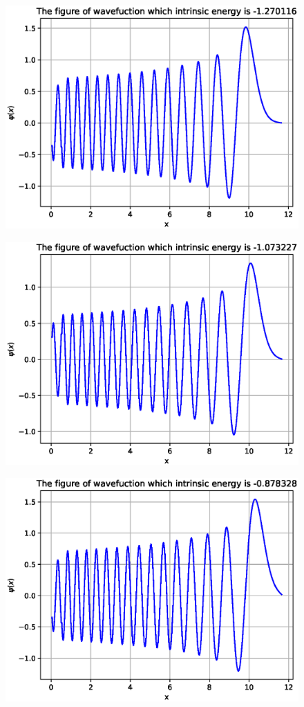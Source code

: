 \documentclass[twoside,twocolumn]{article}
\begin{document}
\begin{CJK*}{UTF8}{gkai}
\begin{figure}
	\label{fig:28}
\end{figure}
\begin{figure}
	\centering
	\includegraphics[width=0.9\linewidth]{figure/29}
	\label{fig:29}
\end{figure}
\begin{figure}
	\centering
	\includegraphics[width=0.9\linewidth]{figure/30}
	\label{fig:30}
\end{figure}
\begin{figure}
	\centering
	\includegraphics[width=0.9\linewidth]{figure/31}

\end{figure}
\end{CJK*}
\end{document}

